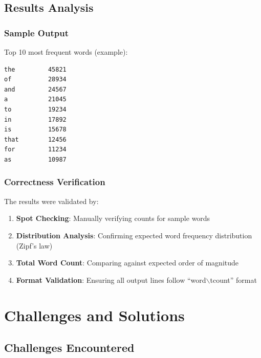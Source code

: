 \documentclass[11pt,a4paper]{article}
\begin{document}
\subsection{Results Analysis}

\subsubsection{Sample Output}

Top 10 most frequent words (example):

\begin{verbatim}
the         45821
of          28934
and         24567
a           21045
to          19234
in          17892
is          15678
that        12456
for         11234
as          10987
\end{verbatim}

\subsubsection{Correctness Verification}

The results were validated by:

\begin{enumerate}
    \item \textbf{Spot Checking}: Manually verifying counts for sample words
    \item \textbf{Distribution Analysis}: Confirming expected word frequency distribution (Zipf's law)
    \item \textbf{Total Word Count}: Comparing against expected order of magnitude
    \item \textbf{Format Validation}: Ensuring all output lines follow ``word$\backslash$tcount'' format
\end{enumerate}

\section{Challenges and Solutions}

\subsection{Challenges Encountered}
\end{document}
